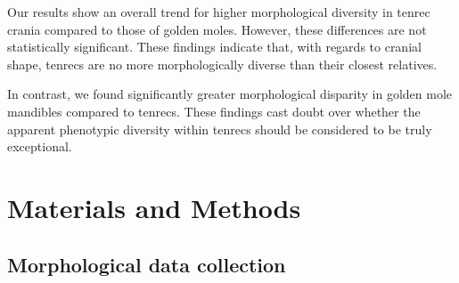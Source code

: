 \documentclass[12pt,a4paper]{article}
\begin{document}




	Our results show an overall trend for higher morphological diversity in tenrec crania compared to those of golden moles. However, these differences are not statistically significant. These findings indicate that, with regards to cranial shape, tenrecs are no more morphologically diverse than their closest relatives. 
	
	
	In contrast, we found significantly greater morphological disparity in golden mole mandibles compared to tenrecs. 
	These findings cast doubt over whether the apparent phenotypic diversity within tenrecs should be considered to be truly exceptional. 


\section{Materials and Methods}

\subsection{Morphological data collection} 
\end{document}
